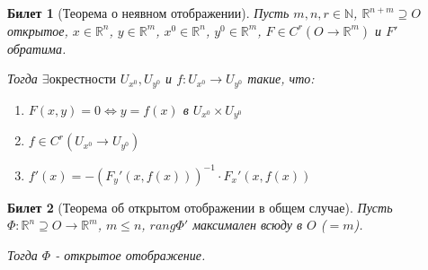 \documentclass[11pt,a4paper,oneside]{scrartcl}
\newtheorem{ticket}{Билет}
\begin{document}
\begin{ticket}[Теорема о неявном отображении]
    Пусть $m, n, r \in \mathbb{N}$, $\mathbb{R}^{n+m} \supseteq O$ открытое,
    $x \in \mathbb{R}^n$, $y \in \mathbb{R}^m$, $x^0 \in \mathbb{R}^n$, $y^0 \in \mathbb{R}^m$,
    $F \in C^r(O \rightarrow \mathbb{R}^m)$
    и $F'$ обратима.

    Тогда $\exists \text{окрестности } U_{x^0}, U_{y^0}$ и $f: U_{x^0} \rightarrow U_{y^0}$
    такие, что:
    \begin{enumerate}
        \item $F(x, y) = 0 \Leftrightarrow y = f(x)$ в $U_{x^0} \times U_{y^0}$
        \item $f \in C^r(U_{x^0} \rightarrow U_{y^0})$
        \item $f'(x) = -(F_y'(x, f(x)))^{-1} \cdot F_x'(x, f(x))$
    \end{enumerate}
\end{ticket}

\begin{ticket}[Теорема об открытом отображении в общем случае]
    Пусть $\Phi: \mathbb{R}^n \supseteq O \rightarrow \mathbb{R}^m$, $m \leq n$,
    $rang \Phi'$ максимален всюду в $O$ ($= m$).

    Тогда $\Phi$ - открытое отображение.
\end{ticket}
\end{document}

